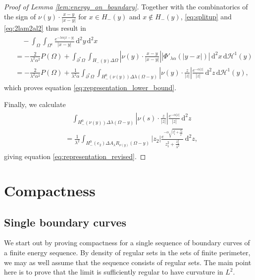\documentclass[11pt]{article}
\numberwithin{statement}{section}
\numberwithin{equation}{section}
\theoremstyle{remark}
\newcommand{\intd}{\, \mathrm{d}} 				%
\newcommand{\Hd}{\mathcal H}				%
\newcommand{\stcomp}[1]{{#1}^{\mathsf{c}}}		%
\begin{document}
\begin{proof}[Proof of Lemma \ref{lem:energy_on_boundary}]
	Together with the combinatorics of the sign of
        $\nu(y) \cdot \frac{ x-y}{|x-y|}$ for $x \in H_-(y)$ and
        $x \not \in H_-(y)$, \eqref{eq:splitup} and
          \eqref{eq:2lam2al2} thus result in
	\begin{align}
	  \begin{split}
            & \quad - \int_{\Omega} \int_{\stcomp{\Omega}}
            \frac{e^{-\lambda \alpha |x-y|}}{|x-y|} \intd^2 y  \intd^2 x\\
            & = -\frac{2}{\lambda^2 \alpha^2} P(\Omega) +
            \int_{\partial^* \Omega} \int_{ H_-(y) \Delta \Omega }
            \left| \nu(y) \cdot \frac{ x-y}{|x-y|} \right|
            |\Phi'_{\lambda \alpha}(|y-x|)|\intd^2 x \intd \Hd^1(y)\\
            & = -\frac{2}{\lambda^2 \alpha^2} P(\Omega) +
            \frac{1}{\lambda^2 \alpha} \int_{\partial^* \Omega} \int_{
              H^0_-(\nu(y)) \Delta \lambda(\Omega - y) } \left|
              \nu(y) \cdot \frac{ z}{|z|} \right| \frac{e^{-\alpha
                |z|}}{|z|}\intd^2 z \intd \Hd^1(y),
	  \end{split}
	\end{align}
	which proves equation \eqref{eq:representation_lower_bound}.

        
	Finally, we calculate
	\begin{align}
	  \begin{split}
            &\quad \int_{ H^0_- (\nu(y)) \Delta \lambda(\Omega -
              y) } \left| \nu(s) \cdot \frac{ z}{|z|} \right|
            \frac{e^{-\alpha |z|}}{|z|} \intd^2 z \\
            & = \frac{1}{\lambda^2} \int_{ H^0_- (e_2) \Delta
              A_\lambda R_{\nu(y)} (\Omega - y) } \left| z_2 \right|
            \frac{e^{-\alpha \sqrt{z_1^2 + \frac{z_2^2}{\lambda^2}
                }}}{z_1^2 + \frac{z_2^2}{\lambda^2}} \intd^2 z,
	  \end{split}
	\end{align}
	giving equation \eqref{eq:representation_revised}.
\end{proof}


\section{Compactness}
\label{sec:compact}


\subsection{Single boundary curves}
We start out by proving compactness for a single sequence of boundary
curves of a finite energy sequence.  By density of regular sets
in the sets of finite perimeter, we may as well assume that the
sequence consists of regular sets.  The main point here is to prove
that the limit is sufficiently regular to have curvature in $L^2$.
       
\end{document}
